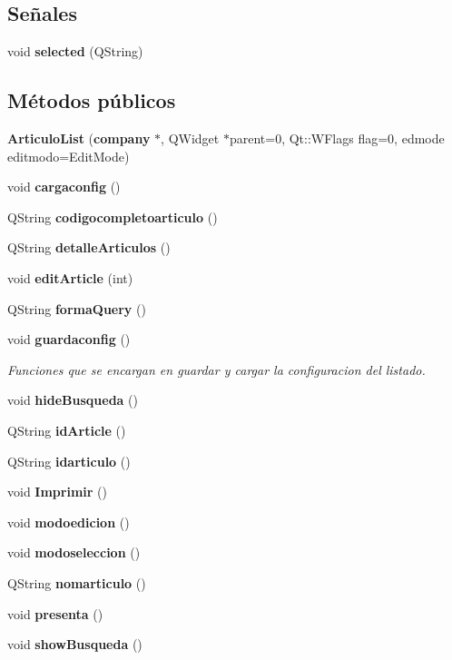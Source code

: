 \subsection*{Se\~{n}ales}
\begin{CompactItemize}
\item 
void {\bf selected} (QString)\label{classArticuloList_l0}

\end{CompactItemize}
\subsection*{M\'{e}todos p\'{u}blicos}
\begin{CompactItemize}
\item 
{\bf Articulo\-List} ({\bf company} $\ast$, QWidget $\ast$parent=0, Qt::WFlags flag=0, edmode editmodo=Edit\-Mode)\label{classArticuloList_a0}

\item 
void {\bf cargaconfig} ()\label{classArticuloList_a1}

\item 
QString {\bf codigocompletoarticulo} ()\label{classArticuloList_a2}

\item 
QString {\bf detalle\-Articulos} ()\label{classArticuloList_a3}

\item 
void {\bf edit\-Article} (int)
\item 
QString {\bf forma\-Query} ()\label{classArticuloList_a5}

\item 
void {\bf guardaconfig} ()\label{classArticuloList_a6}

\begin{CompactList}\small\item\em Funciones que se encargan en guardar y cargar la configuracion del listado. \item\end{CompactList}\item 
void {\bf hide\-Busqueda} ()\label{classArticuloList_a7}

\item 
QString {\bf id\-Article} ()\label{classArticuloList_a8}

\item 
QString {\bf idarticulo} ()\label{classArticuloList_a9}

\item 
void {\bf Imprimir} ()
\item 
void {\bf modoedicion} ()\label{classArticuloList_a11}

\item 
void {\bf modoseleccion} ()\label{classArticuloList_a12}

\item 
QString {\bf nomarticulo} ()\label{classArticuloList_a13}

\item 
void {\bf presenta} ()\label{classArticuloList_a14}

\item 
void {\bf show\-Busqueda} ()\label{classArticuloList_a15}

\end{CompactItemize}


